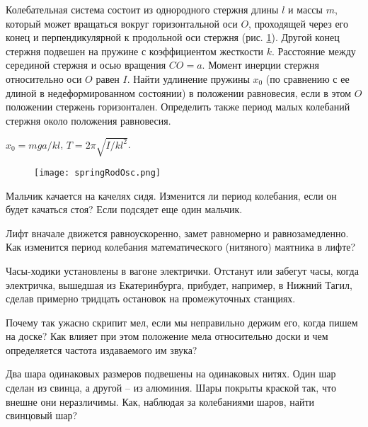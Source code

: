 \begin{ex} %
Колебательная система состоит из однородного стержня длины $l$ и массы $m$, который может вращаться вокруг горизонтальной оси $O$, проходящей через его конец и перпендикулярной к продольной оси стержня (рис. \ref{springRodOsc}). Другой конец стержня подвешен на пружине с коэффициентом жесткости $k$. Расстояние между серединой стержня и осью вращения $CO = a$. Момент инерции стержня относительно оси $O$ равен $I$. Найти удлинение пружины $x_0$ (по сравнению с ее длиной в недеформированном состоянии) в положении равновесия, если в этом $O$ положении стержень горизонтален. Определить также период малых колебаний стержня около положения равновесия.
\begin{ans}
$x_0 = mga/kl$, $T = 2 \pi \sqrt{I/kl^2}$.
\end{ans}
\end{ex}	

\begin{figure}[h]
\centering
\texttt{[image: springRodOsc.png]}
\caption{}
\label{springRodOsc}
\end{figure}

\qualProblems

\begin{ex}
Мальчик качается на качелях сидя. Изменится ли период колебания, если он будет качаться стоя? Если подсядет еще один мальчик.
\end{ex}	

\begin{ex}
Лифт вначале движется равноускоренно, замет равномерно и равнозамедленно. Как изменится период колебания математического (нитяного) маятника в лифте?
\end{ex}	

\begin{ex}
Часы-ходики установлены в вагоне электрички. Отстанут или забегут часы, когда электричка, вышедшая из Екатеринбурга, прибудет, например, в Нижний Тагил, сделав примерно тридцать остановок на промежуточных станциях.
\end{ex}	

\begin{ex}
Почему так ужасно скрипит мел, если мы неправильно держим его, когда пишем на доске? Как влияет при этом положение мела относительно доски и чем определяется частота издаваемого им звука?
\end{ex}	

\begin{ex}
Два шара одинаковых размеров подвешены на одинаковых нитях. Один шар сделан из свинца, а другой – из алюминия. Шары покрыты краской так, что внешне они неразличимы. Как, наблюдая за колебаниями шаров, найти свинцовый шар?
\end{ex}	

